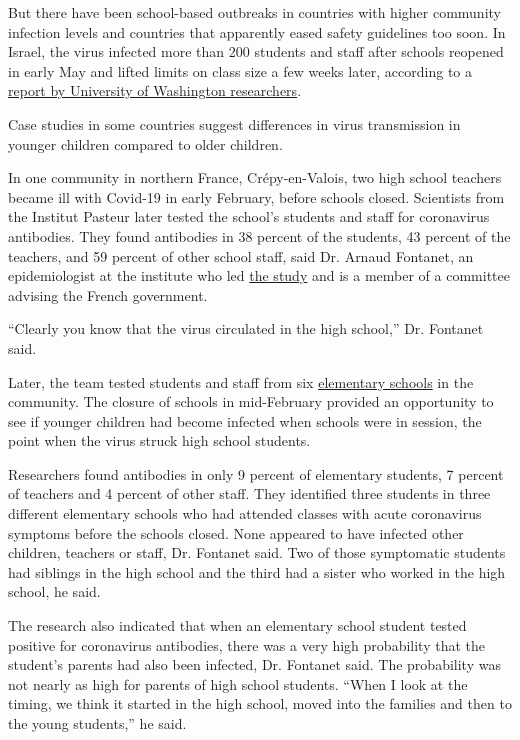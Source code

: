 But there have been school-based outbreaks in countries with higher
community infection levels and countries that apparently eased safety
guidelines too soon. In Israel, the virus infected more than 200
students and staff after schools reopened in early May and lifted limits
on class size a few weeks later, according to a
\href{https://globalhealth.washington.edu/sites/default/files/COVID-19\%20Schools\%20Summary\%20\%282\%29.pdf?mkt_tok=eyJpIjoiTkRreE5XWXlORFF3TXpNeCIsInQiOiJIbVNQTTVySEo0Vzk1cHVBZVVqWnFGVmR1UEJxRGdpd01mTXg4OGw3Mk5nTnpmaUoyMGt2UXIwWVZBOE5GVjIybHA5aStrbzJ3MUxsanoxamZibmlocmpSbXZyVFVoV0VHYU1aTGx0RnpsMXlmOEtXSVJqaDJsZ0RJU1BQcVZjZSJ9}{report
by University of Washington researchers}.

Case studies in some countries suggest differences in virus transmission
in younger children compared to older children.

In one community in northern France, Crépy-en-Valois, two high school
teachers became ill with Covid-19 in early February, before schools
closed. Scientists from the Institut Pasteur later tested the school's
students and staff for coronavirus antibodies. They found antibodies in
38 percent of the students, 43 percent of the teachers, and 59 percent
of other school staff, said Dr. Arnaud Fontanet, an epidemiologist at
the institute who led
\href{https://www.medrxiv.org/content/10.1101/2020.04.18.20071134v1}{the
study} and is a member of a committee advising the French government.

``Clearly you know that the virus circulated in the high school,'' Dr.
Fontanet said.

Later, the team tested students and staff from six
\href{https://www.medrxiv.org/content/10.1101/2020.06.25.20140178v2}{elementary
schools} in the community. The closure of schools in mid-February
provided an opportunity to see if younger children had become infected
when schools were in session, the point when the virus struck high
school students.

Researchers found antibodies in only 9 percent of elementary students, 7
percent of teachers and 4 percent of other staff. They identified three
students in three different elementary schools who had attended classes
with acute coronavirus symptoms before the schools closed. None appeared
to have infected other children, teachers or staff, Dr. Fontanet said.
Two of those symptomatic students had siblings in the high school and
the third had a sister who worked in the high school, he said.

The research also indicated that when an elementary school student
tested positive for coronavirus antibodies, there was a very high
probability that the student's parents had also been infected, Dr.
Fontanet said. The probability was not nearly as high for parents of
high school students. ``When I look at the timing, we think it started
in the high school, moved into the families and then to the young
students,'' he said.

